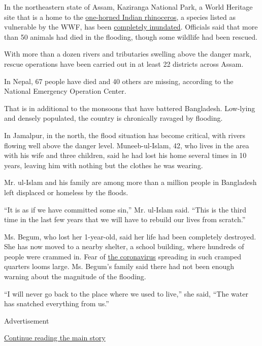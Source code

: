 In the northeastern state of Assam, Kaziranga National Park, a World
Heritage site that is a home to the
\href{https://www.worldwildlife.org/species/greater-one-horned-rhino}{one-horned
Indian rhinoceros}, a species listed as vulnerable by the WWF, has been
\href{https://www.hindustantimes.com/india-news/tiger-takes-shelter-in-goat-shed-as-assam-s-kaziranga-national-park-gets-flooded/story-9nixAzckp91XhLv9MSPe6O.html}{completely
inundated}. Officials said that more than 50 animals had died in the
flooding, though some wildlife had been rescued.

With more than a dozen rivers and tributaries swelling above the danger
mark, rescue operations have been carried out in at least 22 districts
across Assam.

In Nepal, 67 people have died and 40 others are missing, according to
the National Emergency Operation Center.

That is in additional to the monsoons that have battered Bangladesh.
Low-lying and densely populated, the country is chronically ravaged by
flooding.

In Jamalpur, in the north, the flood situation has become critical, with
rivers flowing well above the danger level. Muneeb-ul-Islam, 42, who
lives in the area with his wife and three children, said he had lost his
home several times in 10 years, leaving him with nothing but the clothes
he was wearing.

Mr. ul-Islam and his family are among more than a million people in
Bangladesh left displaced or homeless by the floods.

``It is as if we have committed some sin,'' Mr. ul-Islam said. ``This is
the third time in the last few years that we will have to rebuild our
lives from scratch.''

Ms. Begum, who lost her 1-year-old, said her life had been completely
destroyed. She has now moved to a nearby shelter, a school building,
where hundreds of people were crammed in. Fear of
\href{https://www.nytimes.com/interactive/2020/world/coronavirus-maps.html}{the
coronavirus} spreading in such cramped quarters looms large. Ms. Begum's
family said there had not been enough warning about the magnitude of the
flooding.

``I will never go back to the place where we used to live,'' she said,
``The water has snatched everything from us.''

Advertisement

\protect\hyperlink{after-bottom}{Continue reading the main story}

